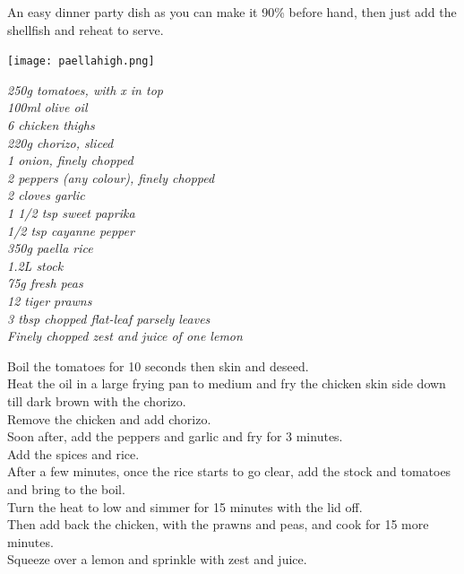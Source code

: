 \documentclass{tufte-book}
\begin{document}
An easy dinner party dish as you can make it 90\% before hand, then just add the shellfish and reheat to serve.

\begin{marginfigure}%
  \texttt{[image: paellahigh.png]}
\end{marginfigure}

\smallskip
\emph{250g tomatoes, with x in top
\\100ml olive oil
\\6 chicken thighs
\\220g chorizo, sliced
\\1 onion, finely chopped
\\2 peppers (any colour), finely chopped
\\2 cloves garlic
\\1 1/2 tsp sweet paprika
\\1/2 tsp cayanne pepper
\\350g paella rice
\\1.2L stock
\\75g fresh peas
\\12 tiger prawns
\\3 tbsp chopped flat-leaf parsely leaves
\\Finely chopped zest and juice of one lemon
}

\smallskip
Boil the tomatoes for 10 seconds then skin and deseed.
\\Heat the oil in a large frying pan to medium and fry the chicken skin side down till dark brown with the chorizo.
\\Remove the chicken and add chorizo.
\\Soon after, add the peppers and garlic and fry for 3 minutes.
\\Add the spices and rice.
\\After a few minutes, once the rice starts to go clear, add the stock and tomatoes and bring to the boil.
\\Turn the heat to low and simmer for 15 minutes with the lid off.
\\Then add back the chicken, with the prawns and peas, and cook for 15 more minutes.
\\Squeeze over a lemon and sprinkle with zest and juice.
\end{document}
